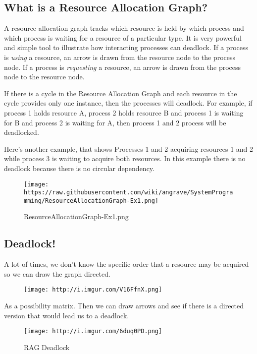 \subsection{What is a Resource Allocation
Graph?}\label{what-is-a-resource-allocation-graph}

A resource allocation graph tracks which resource is held by which
process and which process is waiting for a resource of a particular
type. It is very powerful and simple tool to illustrate how interacting
processes can deadlock. If a process is \emph{using} a resource, an
arrow is drawn from the resource node to the process node. If a process
is \emph{requesting} a resource, an arrow is drawn from the process node
to the resource node.

If there is a cycle in the Resource Allocation Graph and each resource
in the cycle provides only one instance, then the processes will
deadlock. For example, if process 1 holds resource A, process 2 holds
resource B and process 1 is waiting for B and process 2 is waiting for
A, then process 1 and 2 process will be deadlocked.

Here's another example, that shows Processes 1 and 2 acquiring resources
1 and 2 while process 3 is waiting to acquire both resources. In this
example there is no deadlock because there is no circular dependency.

\begin{figure}[htbp]
\centering
\texttt{[image: https://raw.githubusercontent.com/wiki/angrave/SystemProgramming/ResourceAllocationGraph-Ex1.png]}
\caption{ResourceAllocationGraph-Ex1.png}
\end{figure}

\subsection{Deadlock!}\label{deadlock}

A lot of times, we don't know the specific order that a resource may be
acquired so we can draw the graph directed.

\begin{figure}[htbp]
\centering
\texttt{[image: http://i.imgur.com/V16FfnX.png]}
\caption{}
\end{figure}

As a possibility matrix. Then we can draw arrows and see if there is a
directed version that would lead us to a deadlock.

\begin{figure}[htbp]
\centering
\texttt{[image: http://i.imgur.com/6duq0PD.png]}
\caption{RAG Deadlock}
\end{figure}

